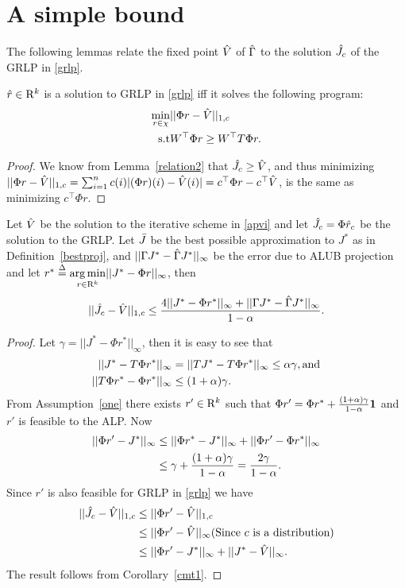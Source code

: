 \section{A simple bound}
The following lemmas relate the fixed point $\hat{V}$ of $\hat{\Gamma}$ to the solution $\hat{J}_c$ of the GRLP in \eqref{grlp}.
\begin{lemma}\label{srw}
$\hat{r} \in \mathrm{R}^k$ is a solution to GRLP in \eqref{grlp} iff it solves the following program:
\begin{align}\label{grlpeqprog}
\min_{r\in \chi} &||\Phi r-\hv||_{1,c}\nn\\
\text{s.t}\mb & W^\top \Phi r\geq W^\top T \Phi r.
\end{align}
\end{lemma}
\begin{proof}
We know from Lemma~\ref{relation2} that $\hat{J}_c\geq\hat{V}$, and thus minimizing $||\Phi r-\hat{V}||_{1,c}=\sum_{i=1}^n c(i) |(\Phi r)(i)-\hat{V}(i)|=c^\top \Phi r-c^\top \hat{V}$, is the same as minimizing $c^\top \Phi r$.
\end{proof}
\begin{theorem}\label{mt2}
Let $\hat{V}$ be the solution to the iterative scheme in \eqref{apvi} and let $\hat{J}_c=\Phi \hat{r}_c$ be the solution to the GRLP. Let $\bar{J}$ be the best possible approximation to $J^*$ as in Definition~\ref{bestproj}, and $||\Gamma J^* -\hat{\Gamma} J^*||_\infty$ be the error due to ALUB projection and let $r^*\stackrel{\Delta}{=}\underset{r\in \mathrm{R}^k}{\arg\min}||J^*-\Phi r||_\infty$, then
\begin{align}
||\hat{J}_c-\hat{V}||_{1,c}\leq\frac{4||J^*-\Phi r^*||_\infty+||\Gamma J^*-\hat{\Gamma} J^*||_\infty}{1-\alpha}.
\end{align}
\end{theorem}
\begin{proof}
Let $\gamma=||J^*-\Phi r^*||_\infty$, then  it is easy to see that
\begin{align}
||J^*-T\Phi r^*||_\infty&=||TJ^*-T\Phi r^*||_\infty\leq\alpha\gamma,\relax{ }\text{and}\nonumber\\
||T\Phi r^*-\Phi r^*||_\infty&\leq(1+\alpha)\gamma.
\end{align}
From Assumption~\ref{one} there exists $r'\in \mathrm{R}^k$ such that $\Phi r'=\Phi r^*+\frac{(1+\alpha)\gamma}{1-\alpha}\mathbf{1}$ and $r'$ is feasible to the ALP. Now
\begin{align}
||\Phi r'-J^*||_\infty&\leq ||\Phi r^* -J^*||_\infty+||\Phi r'-\Phi r^*||_\infty\nonumber\\&\leq \gamma+\frac{(1+\alpha)\gamma}{1-\alpha}=\frac{2\gamma}{1-\alpha}.
\end{align}
Since $r'$ is also feasible for GRLP in \eqref{grlp} we have
\begin{align}
||\hat{J}_c-\hat{V}||_{1,c}&\leq||\Phi r'-\hat{V}||_{1,c}\nonumber\\
&\leq||\Phi r'-\hat{V}||_\infty\relax{ }\text{(Since $c$ is a distribution)}\nonumber\\
&\leq||\Phi r'-J^*||_\infty+||J^*-\hat{V}||_\infty.\nonumber
\end{align}
The result follows from Corollary~\ref{cmt1}.
\end{proof}\\
